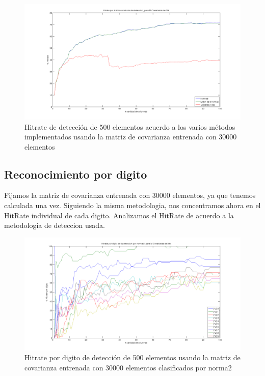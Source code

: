 \begin{figure}[H]
\begin {center}
\includegraphics[width=\hrwidth]{plots/hitrate-30kcv.png}
\end {center}
\caption{Hitrate de detecci\'on de 500 elementos acuerdo a los varios m\'etodos implementados
usando la matriz de covarianza entrenada con 30000 elementos}
\label{fig:HR30kcv}
\end{figure}



\subsection{Reconocimiento por digito}
Fijamos la matriz de covarianza entrenada con 30000 elementos, ya que tenemos calculada una vez.
Siguiendo la misma metodologia, nos concentramos ahora en el HitRate individual
de cada digito. Analizamos el HitRate de acuerdo a la metodologia de deteccion usada.
\def \pdwidth {500pt}

\begin{figure}[H]
\begin {center}
\includegraphics[width=\pdwidth]{plots/pordig-30kcv-norma2.png}
\end {center}
\caption{Hitrate por digito de detecci\'on de 500 elementos usando la matriz de covarianza entrenada con 30000 elementos
clasificados por norma2}
\label{fig:HRD30kcv-n2}
\end{figure}

